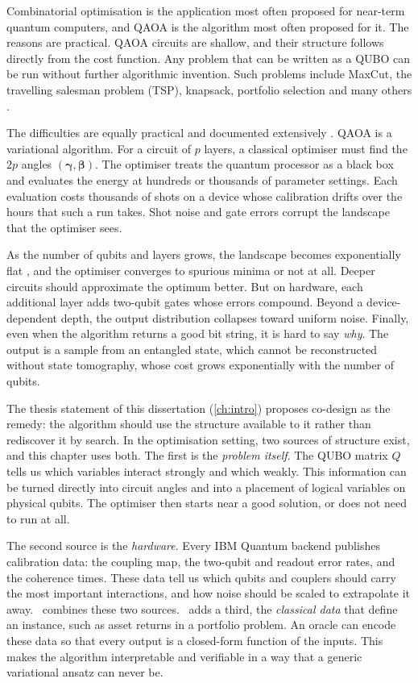 Combinatorial optimisation is the application most often proposed for near-term quantum computers, and QAOA \cite{farhi2014qaoa} is the algorithm most often proposed for it. The reasons are practical. QAOA circuits are shallow, and their structure follows directly from the cost function. Any problem that can be written as a QUBO can be run without further algorithmic invention. Such problems include MaxCut, the travelling salesman problem (TSP), knapsack, portfolio selection and many others \cite{glover2018qubo}.

The difficulties are equally practical and documented extensively \cite{abbas2024challengesqopt,weidenfeller2022qaoascaling,cerezo2021vqa}. QAOA is a variational algorithm. For a circuit of $p$ layers, a classical optimiser must find the $2p$ angles $(\bm{\gamma},\bm{\beta})$. The optimiser treats the quantum processor as a black box and evaluates the energy at hundreds or thousands of parameter settings. Each evaluation costs thousands of shots on a device whose calibration drifts over the hours that such a run takes. Shot noise and gate errors corrupt the landscape that the optimiser sees.

As the number of qubits and layers grows, the landscape becomes exponentially flat \cite{mcclean2018barren}, and the optimiser converges to spurious minima or not at all. Deeper circuits should approximate the optimum better. But on hardware, each additional layer adds two-qubit gates whose errors compound. Beyond a device-dependent depth, the output distribution collapses toward uniform noise. Finally, even when the algorithm returns a good bit string, it is hard to say \emph{why}. The output is a sample from an entangled state, which cannot be reconstructed without state tomography, whose cost grows exponentially with the number of qubits.

The thesis statement of this dissertation (\cref{ch:intro}) proposes co-design as the remedy: the algorithm should use the structure available to it rather than rediscover it by search. In the optimisation setting, two sources of structure exist, and this chapter uses both. The first is the \emph{problem itself}. The QUBO matrix $Q$ tells us which variables interact strongly and which weakly. This information can be turned directly into circuit angles and into a placement of logical variables on physical qubits. The optimiser then starts near a good solution, or does not need to run at all.

The second source is the \emph{hardware}. Every IBM Quantum backend publishes calibration data: the coupling map, the two-qubit and readout error rates, and the coherence times. These data tell us which qubits and couplers should carry the most important interactions, and how noise should be scaled to extrapolate it away. \deal\ combines these two sources. \qawa\ adds a third, the \emph{classical data} that define an instance, such as asset returns in a portfolio problem. An oracle can encode these data so that every output is a closed-form function of the inputs. This makes the algorithm interpretable and verifiable in a way that a generic variational ansatz can never be.

